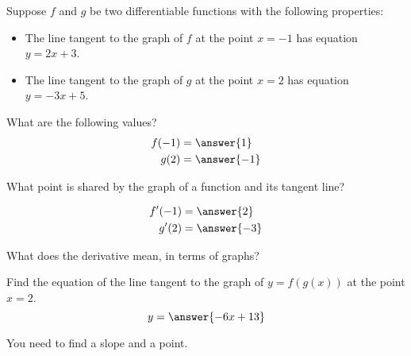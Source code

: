 \documentclass{ximera}
\author{Bobby Ramsey}
\begin{document}
\begin{exercise}
	Suppose $f$ and $g$ be two differentiable functions with the following properties:
	\begin{itemize}
		\item The line tangent to the graph of $f$ at the point $x=-1$ has equation $y=2x+3$.
		\item The line tangent to the graph of $g$ at the point $x=2$ has equation $y=-3x+5$.
	\end{itemize}

	What are the following values?
	\begin{align*}
		f(-1) &= \answer{1} \\
		g(2) &= \answer{-1}
	\end{align*}
	\begin{hint}
		What point is shared by the graph of a function and its tangent line?
	\end{hint}
	\begin{exercise}
		\begin{align*}
			f'(-1) &= \answer{2} \\
			g'(2) &= \answer{-3}
		\end{align*}
		\begin{hint}
			What does the derivative mean, in terms of graphs?
		\end{hint}

		\begin{exercise}
			Find the equation of the line tangent to the graph of $y=f( g( x ) )$ at the point $x=2$.
			\[ y = \answer{-6x+13} \]
			\begin{hint}
				You need to find a slope and a point.
			\end{hint}
		\end{exercise}
	
	\end{exercise}

\end{exercise}
\end{document}
